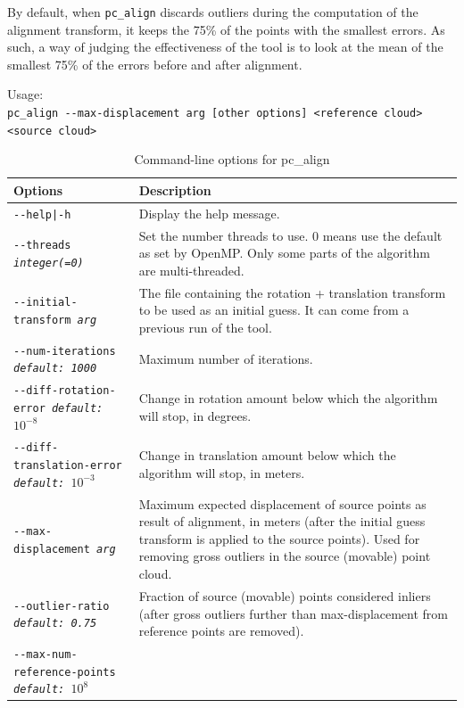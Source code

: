 By default, when \texttt{pc\_align} discards
outliers during the computation of the alignment transform, it keeps
the 75\% of the points with the smallest errors. As such, a way of
judging the effectiveness of the tool is to look at the mean of the
smallest 75\% of the errors before and after alignment.

\medskip

Usage:\\
\hspace*{2em}\texttt{pc\_align -\/-max-displacement arg [other options] <reference cloud> <source cloud>}

\medskip

\begin{longtable}{|p{8cm}|p{9cm}|}
\caption{Command-line options for pc\_align}
\label{tbl:pcalign}
\endfirsthead
\endhead
\endfoot
\endlastfoot
\hline
Options & Description \\ \hline \hline
\texttt{-\/-help|-h} & Display the help message.\\ \hline
\texttt{-\/-threads \textit{integer(=0)}} & Set the number threads to
use. 0 means use the default as set by OpenMP. Only some parts of the algorithm are multi-threaded.\\ \hline
\texttt{-\/-initial-transform \textit{arg}} &
The file containing the rotation + translation transform to be used as an
initial guess. It can come from a previous run of the tool. \\ \hline
\texttt{-\/-num-iterations \textit{default: 1000}} &  Maximum number of iterations. \\ \hline
\texttt{-\/-diff-rotation-error \textit{default: $10^{-8}$}} & Change in rotation amount below which the algorithm will stop, in degrees. \\ \hline
\texttt{-\/-diff-translation-error \textit{default: $10^{-3}$}} & Change in translation amount below which the algorithm will stop, in meters. \\ \hline
\texttt{-\/-max-displacement \textit{arg}} & Maximum expected
displacement of source points as result of alignment, in meters (after
the initial guess transform is applied to the source points). Used
for removing gross outliers in the source (movable) point cloud.\\ \hline
\texttt{-\/-outlier-ratio \textit{default: 0.75}} &  Fraction of source (movable) points considered inliers (after gross outliers further than max-displacement from reference points are removed). \\ \hline
\texttt{-\/-max-num-reference-points \textit{default: $10^8$}} &

\end{longtable}
